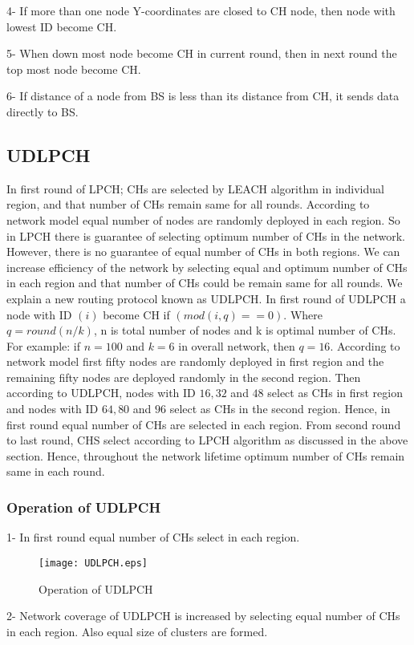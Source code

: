 \documentclass[journal]{IEEEtran}
\begin{document}
{4}- If more than one node Y-coordinates are closed to CH node, then node with lowest ID become CH.

{5}- When down most node become CH in current round, then in next round the top most node become CH.

{6}- If distance of a node from BS is less than its distance from CH, it sends data directly to BS.
\subsection{UDLPCH}
In first round of LPCH; CHs are selected by LEACH algorithm in individual region, and that number of CHs remain same for all rounds. According to network model equal number of nodes are randomly deployed in each region. So in LPCH there is guarantee of selecting optimum number of CHs in the network. However, there is no guarantee of equal number of CHs in both regions. We can increase efficiency of the network by selecting equal and optimum number of CHs in each region and that number of CHs could be remain same for all rounds. We explain a new routing protocol known as UDLPCH. In first round of UDLPCH a node with ID $(i)$ become CH if $(mod(i,q)==0)$. Where $q=round(n/k)$, n is total number of nodes and k is optimal number of CHs.
For example: if $n=100$ and $k=6$ in overall network, then $q=16$. According to network model first fifty nodes are randomly deployed in first region and the remaining fifty nodes are deployed randomly in the second region. Then according to UDLPCH, nodes with ID $16,32$ and $48$ select as CHs in first region and nodes with ID $64,80$ and $96$ select as CHs in the second region. Hence, in first round equal number of CHs are selected in each region. From second round to last round, CHS select according to LPCH algorithm as discussed in the above section. Hence, throughout the network lifetime optimum number of CHs remain same in each round. 
\subsubsection{Operation of UDLPCH }
{1}- In first round equal number of CHs select in each region.
\begin{figure*}[t]
\centering
\texttt{[image: UDLPCH.eps]}
\caption{Operation of UDLPCH}
\end{figure*}

{2}- Network coverage of UDLPCH is increased by selecting equal number of CHs in each region. Also equal size of clusters are formed.
\end{document}
